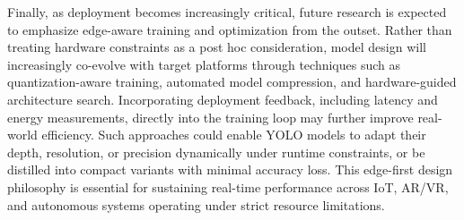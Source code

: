 \documentclass{article}
\begin{document}
Finally, as deployment becomes increasingly critical, future research is expected to emphasize edge-aware training and optimization from the outset. Rather than treating hardware constraints as a post hoc consideration, model design will increasingly co-evolve with target platforms through techniques such as quantization-aware training, automated model compression, and hardware-guided architecture search. Incorporating deployment feedback, including latency and energy measurements, directly into the training loop may further improve real-world efficiency. Such approaches could enable YOLO models to adapt their depth, resolution, or precision dynamically under runtime constraints, or be distilled into compact variants with minimal accuracy loss. This edge-first design philosophy is essential for sustaining real-time performance across IoT, AR/VR, and autonomous systems operating under strict resource limitations.

  







\end{document}
